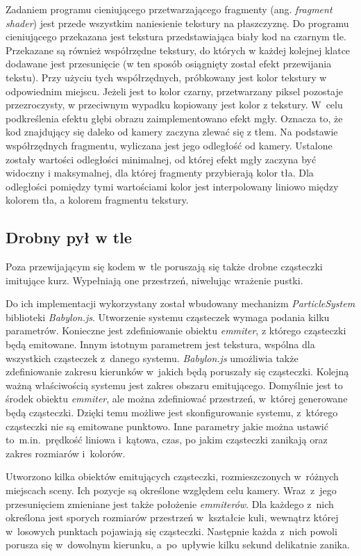 \documentclass[12pt,a4paper,polish,thesis]{dcsbook}
\begin{document}
{	Zadaniem programu cieniującego przetwarzającego fragmenty (ang. \textit{fragment shader}) jest przede wszystkim naniesienie tekstury na płaszczyznę. Do programu cieniującego przekazana jest tekstura przedstawiająca biały kod na czarnym tle. Przekazane są również współrzędne tekstury, do których w każdej kolejnej klatce dodawane jest przesunięcie (w ten sposób osiągnięty został efekt przewijania tekstu). Przy użyciu tych współrzędnych, próbkowany jest kolor tekstury w odpowiednim miejscu. Jeżeli jest to kolor czarny, przetwarzany piksel pozostaje przezroczysty, w przeciwnym wypadku kopiowany jest kolor z tekstury. W~celu podkreślenia efektu głębi obrazu zaimplementowano efekt mgły. Oznacza to, że kod znajdujący się daleko od kamery zaczyna zlewać się z tłem. Na podstawie współrzędnych fragmentu, wyliczana jest jego odległość od kamery. Ustalone zostały wartości odległości minimalnej, od której efekt mgły zaczyna być widoczny i maksymalnej, dla której fragmenty przybierają kolor tła. Dla odległości pomiędzy tymi wartościami kolor jest interpolowany liniowo między kolorem tła, a kolorem fragmentu tekstury.

	\subsection{Drobny pył w tle}

	Poza przewijającym się kodem w~tle poruszają się także drobne cząsteczki imitujące kurz. Wypełniają one przestrzeń, niwelując wrażenie pustki.

	Do ich implementacji wykorzystany został wbudowany mechanizm \textit{ParticleSystem} biblioteki \textit{Babylon.js}. Utworzenie systemu cząsteczek wymaga podania kilku parametrów. Konieczne jest zdefiniowanie obiektu \textit{emmiter}, z którego cząsteczki będą emitowane. Innym istotnym parametrem jest tekstura, wspólna dla wszystkich cząsteczek z~danego systemu. \textit{Babylon.js} umożliwia także zdefiniowanie zakresu kierunków w~jakich będą poruszały się cząsteczki. Kolejną ważną właściwością systemu jest zakres obszaru emitującego. Domyślnie jest to środek obiektu \textit{emmiter}, ale można zdefiniować przestrzeń, w~której generowane będą cząsteczki. Dzięki temu możliwe jest skonfigurowanie systemu, z~którego cząsteczki nie są emitowane punktowo. Inne parametry jakie można ustawić to~m.in.~prędkość liniowa i~kątowa, czas, po jakim cząsteczki zanikają oraz zakres rozmiarów i~kolorów.

	Utworzono kilka obiektów emitujących cząsteczki, rozmieszczonych w~różnych miejscach sceny. Ich pozycje są określone względem celu kamery. Wraz~z~jego przesunięciem zmieniane jest także położenie \textit{emmiterów}. Dla każdego z~nich określona jest sporych rozmiarów przestrzeń w~kształcie kuli, wewnątrz której w~losowych punktach pojawiają się cząsteczki. Następnie każda z~nich powoli porusza się w~dowolnym kierunku, a~po~upływie kilku sekund delikatnie zanika.

}
\end{document}
